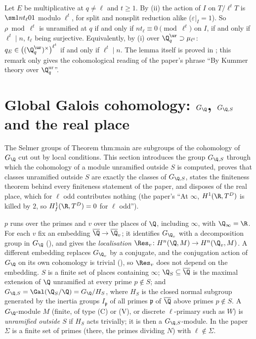 \begin{remark}\label{rem:galcoh:tamagawa-exp-cohomological}
Let $E$ be multiplicative at $q\ne\ell$ and $t\ge1$. By (ii) the action of $I$ on $T/\ell^tT$ is $\sm1{nt_\ell}01$ modulo $\ell^t$, for split and
nonsplit reduction alike ($\varepsilon|_I=1$). So $\rho\bmod\ell^t$ is unramified at $q$ if and only if $nt_\ell\equiv0\pmod{\ell^t}$ on $I$, if and only if $\ell^t\mid n$, $t_\ell$ being
surjective. Equivalently, by (i) over $\Q_q^{\ur}\supset\mu_{\ell^t}$: $q_E\in\bigl((\Q_q^{\ur})^\times\bigr)^{\ell^t}$ if and only if $\ell^t\mid n$. The lemma
itself is proved in ; this remark only gives the cohomological reading of the paper's phrase ``By Kummer theory over $\Q_q^{\mathrm{ur}}$''.
\end{remark}
\section{Global Galois cohomology: \texorpdfstring{$G_\Q$}{G\_Q}, \texorpdfstring{$G_{\Q,S}$}{G\_Q,S} and the real place}\label{sec:galcoh:global}

The Selmer groups of Theorem thm:main are subgroups of the cohomology of $G_\Q$ cut out by local conditions. This section introduces the group $G_{\Q,S}$ through
which the cohomology of a module unramified outside $S$ is computed, proves that classes unramified outside $S$ are exactly the classes of $G_{\Q,S}$, states the
finiteness theorem behind every finiteness statement of the paper, and disposes of the real place, which for $\ell$ odd contributes nothing (the paper's
``At $\infty$, $H^1(\R,T^D)$ is killed by $2$, so $H^1_f(\R,T^D)=0$ for $\ell$ odd'').

\begin{definition}[places, $\Q_S$, $G_{\Q,S}$]\label{def:galcoh:gqs}
$p$ runs over the primes and $v$ over the places of $\Q$, including $\infty$, with $\Q_\infty=\R$. For each $v$ fix an embedding $\overline\Q\to\overline\Q_v$; it identifies $G_{\Q_v}$
with a decomposition group in $G_\Q$ (), and gives the \emph{localisation} $\Res_v\colon H^n(\Q,M)\to H^n(\Q_v,M)$. A different embedding replaces
$G_{\Q_v}$ by a conjugate, and the conjugation action of $G_\Q$ on its own cohomology is trivial (), so $\Res_v$ does not depend on the
embedding. $S$ is a finite set of places containing $\infty$; $\Q_S\subseteq\overline\Q$ is the maximal extension of $\Q$ unramified at every prime $p\notin S$; and
$G_{\Q,S}=\Gal(\Q_S/\Q)=G_\Q/H_S$, where $H_S$ is the closed normal subgroup generated by the inertia groups $I_{\mathfrak p}$ of all primes $\mathfrak p$ of $\overline\Q$ above
primes $p\notin S$. A $G_\Q$-module $M$ (finite, of type (C) or (V), or discrete $\ell$-primary such as $W$) is \emph{unramified outside $S$} if $H_S$ acts trivially; it is then a
$G_{\Q,S}$-module. In the paper $\Sigma$ is a finite set of primes (there, the primes dividing $N$) with $\ell\notin\Sigma$.
\end{definition}

